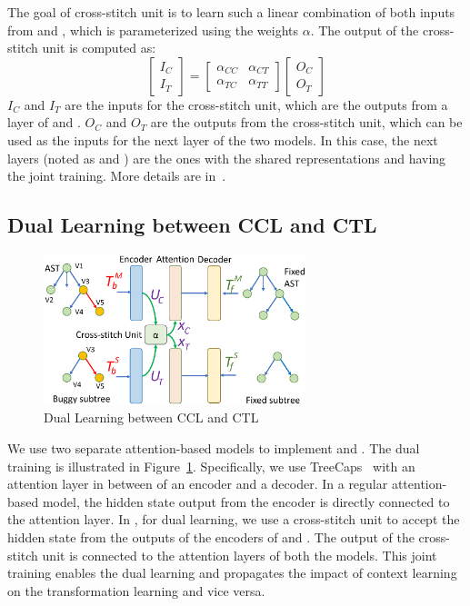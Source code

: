 The goal of cross-stitch unit is to learn such a linear combination of
both inputs from  and , which is parameterized
using the weights $\alpha$. The output of the cross-stitch unit is
computed as:
\begin{equation}\label{eq:cross-stitch}
	\begin{bmatrix}
		I_C\\
		I_T
	\end{bmatrix}
	=
	\begin{bmatrix}
		\alpha_{CC} &  \alpha_{CT} \\
		\alpha_{TC} &  \alpha_{TT}
	\end{bmatrix}
	\begin{bmatrix}
		O_C\\
		O_T
	\end{bmatrix}
\end{equation}
$I_C$ and $I_T$ are the inputs for the cross-stitch unit, which are
the outputs from a layer of  and . $O_C$ and $O_T$
are the outputs from the cross-stitch unit, which can be used as the
inputs for the next layer of the two models. In this case, the next
layers (noted as  and ) are the ones with the
shared representations and having the joint training. More details are
in~\cite{misra2016cross}.

\subsection{Dual Learning between CCL and CTL}

\begin{figure}[t]
	\centering
	\includegraphics[width=3in]{graphs/dual-learning-repair.png}
	\caption{Dual Learning between CCL and CTL}
	\label{fig:dual-learning}
\end{figure}

We use two separate attention-based  models to implement
 and . The dual training is illustrated in
Figure~\ref{fig:dual-learning}. Specifically, we use
TreeCaps~\cite{bui2021treecaps} with an attention layer in between of
an encoder and a decoder. In a regular attention-based 
model, the hidden state output from the encoder is directly
connected to the attention layer. In {\tool}, for dual learning, we
use a cross-stitch unit to accept the hidden state from the outputs of
the encoders of  and . The output of the
cross-stitch unit is connected to the attention layers of both the
models. This joint training enables the dual learning and propagates
the impact of context learning on the transformation learning and vice
versa.

